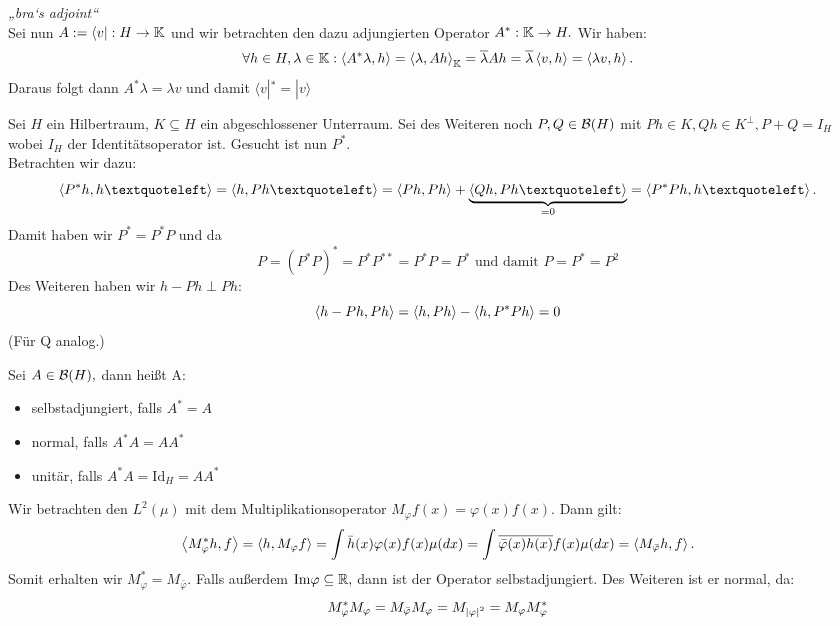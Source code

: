 \begin{ex} \label{bras_adj} \textit{„bra‘s adjoint“} \\ 
    Sei nun $A := \langle v |: H \to \mathbb{K}$ und wir betrachten den dazu adjungierten Operator $A^*: \mathbb{K} \to H.$  Wir haben: \[\forall h \in H, \lambda \in \mathbb{K}: \left\langle A^* \lambda, h\right\rangle = \left\langle\lambda, Ah\right\rangle_{\mathbb{K}} = \overline{\lambda}Ah = \overline{\lambda} \left\langle v, h\right\rangle = \left\langle\lambda v, h\right\rangle.\] Daraus folgt dann $A^*\lambda = \lambda v$ und damit $\langle v |^* = | v \rangle$
\end{ex}

\begin{ex} Sei $H$ ein Hilbertraum, $K \subseteq H$ ein abgeschlossener Unterraum.
	Sei des Weiteren noch $P, Q \in \mathcal{B}(H)$ mit $Ph \in K, Qh \in K^{\perp}, P + Q = I_H$ wobei $I_H$ der Identitätsoperator ist.  Gesucht ist nun $P^*.$ \\
Betrachten wir dazu: \[\ip{P^*h, h‘} = \ip{h, Ph‘} = \ip{Ph, Ph} + \underbrace{\ip{Qh, Ph‘}}_{= 0} = \ip{P^*Ph, h‘}.\] Damit haben wir $P^* = P^{*}P$ und da \[P = (P^*P)^* = P^*P^{**} = P^*P = P^* \text{ und damit } P = P^* = P^2\] Des Weiteren haben wir $h-Ph \perp Ph$:
\[\left\langle h-Ph, Ph\right\rangle = \left\langle h,Ph\right\rangle- \left\langle h, P^*Ph\right\rangle = 0\] (Für Q analog.)
\end{ex}

\begin{definition} Sei $A \in \mathcal{B}(H),$ dann heißt A:
	\begin{itemize}
		\item selbstadjungiert, falls $A^* = A$
		\item normal, falls $A^*A = AA^*$
		\item unitär, falls $A^*A = \text{Id}_H = AA^*$
	\end{itemize}
\end{definition}

\begin{ex}
	Wir betrachten den $L^2(\mu)$ mit dem Multiplikationsoperator $M_{\varphi}f(x) = \varphi(x)f(x).$ Dann gilt: \[\left\langle M_{\varphi}^*h, f\right\rangle = \left\langle h, M_{\varphi}f\right\rangle = \int \bar h(x) \varphi(x)f(x)\mu(dx) = \int \overline{\bar \varphi(x) h(x)}f(x) \mu(dx) = \left\langle M_{\bar \varphi}h, f\right\rangle.\] Somit erhalten wir $M_{\varphi}^* = M_{\bar \varphi}.$ Falls außerdem $\text{Im} \varphi \subseteq \mathbb{R},$ dann ist der Operator selbstadjungiert. Des Weiteren ist er normal, da: \[M_{\varphi}^*M_{\varphi} = M_{\bar \varphi}M_{\varphi} = M_{\left\lvert \varphi \right\rvert^2} = M_{\varphi}M_{\varphi}^*\]
\end{ex}
